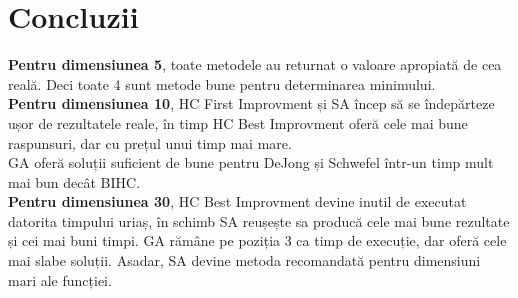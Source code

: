 \documentclass{article}
\begin{document}
\section{Concluzii}
\textbf{Pentru dimensiunea 5}, toate metodele au returnat o valoare apropiată de cea reală. Deci toate 4 sunt metode bune pentru determinarea minimului.\\
\textbf{Pentru dimensiunea 10}, HC First Improvment și SA încep să se îndepărteze ușor de rezultatele reale, în timp HC Best Improvment oferă cele mai bune raspunsuri, dar cu prețul unui timp mai mare. \\
GA oferă soluții suficient de bune pentru DeJong și Schwefel într-un timp mult mai bun decât BIHC.\\
\textbf{Pentru dimensiunea 30}, HC Best Improvment devine inutil de executat datorita timpului uriaș, în schimb SA reușește sa producă cele mai bune rezultate și cei mai buni timpi. GA rămâne pe poziția 3 ca timp de execuție, dar oferă cele mai slabe soluții. Asadar, SA devine metoda recomandată pentru dimensiuni mari ale funcției.
\end{document}
